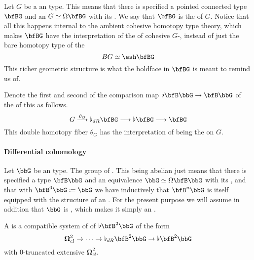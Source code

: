 Let $G$ be a an  type. This means that there is specified a pointed connected type $\bfBG$ and an  $G\simeq \Omega \bfBG$ with its . We say that $\bfBG$ is the  of $G$. Notice that all this happens internal to the ambient cohesive homotopy type theory, which makes $\bfBG$ have the interpretation of the  of cohesive $G$-, instead of just the bare homotopy type of the 
\begin{displaymath}
B G \simeq \esh  \bfBG
\end{displaymath}
This richer geometric structure is what the boldface in $\bfBG$ is meant to remind us of.
\begin{defn}
\label{}\hypertarget{}{}
Denote the first and second  of the comparison map $\flat \bfB\bbG \to \bfB\bbG$ of the  of this as follows.
\begin{displaymath}
G
\stackrel{\theta_G}{\longrightarrow}
\flat_{dR}\bfBG
\longrightarrow
\flat \bfBG
\longrightarrow
\bfBG
\end{displaymath}
This double homotopy fiber $\theta_G$ has the interpretation of being the  on $G$.
\end{defn}
\hypertarget{differential_cohomology}{}\paragraph*{{Differential cohomology}}\label{differential_cohomology}
Let $\bbG$ be an  type. The group of .
This being abelian just means that there is specified a  type $\bfB \bbG$ and an equivalence $\bbG\simeq \Omega \bfB \bbG$ with its , and that with $\bfB^0 \bbG \coloneqq \bbG$ we have inductively that $\bfB^n \bbG$ is itself equipped with the structure of an .
For the present purpose we will assume in addition that $\bbG$ is , which makes it simply an .
\begin{defn}
\label{}\hypertarget{}{}
A  is a compatible system of  of $\flat \bfB^2\bbG$ of the form
\begin{displaymath}
\mathbf{\Omega}^{2}_{cl}
\to
\cdots
\to
\flat_{dR} \bfB^2 \bbG
\to
\flat \bfB^2 \bbG
\end{displaymath}
with 0-truncated extensive $\mathbf{\Omega}^{2}_{cl}$.
\end{defn}
